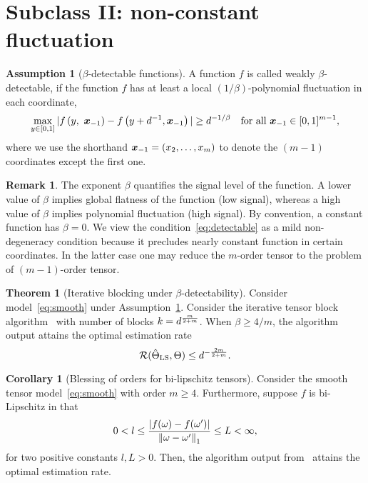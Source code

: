 \documentclass[10pt]{article}
\theoremstyle{definition}
\newtheorem{thm}{Theorem}[section]
\newtheorem{cor}{Corollary}[section]
\theoremstyle{definition}
\newtheorem{assumption}{Assumption}
\newtheorem{rmk}{Remark}
\theoremstyle{definition}
\begin{document}
\section{Subclass II: non-constant fluctuation}
\begin{assumption}[$\beta$-detectable functions]\label{ass:detectable} A function $f$ is called weakly $\beta$-detectable, if the function $f$ has at least a local $(1/\beta)$-polynomial fluctuation in each coordinate,
\begin{equation}\label{eq:detectable}
\max_{y\in[0,1]} |f\left(y,\ \bm x_{-1}\right) - f\left(y+d^{-1}, \bm x_{-1}\right)|\geq d^{-1/\beta} \quad \text{for all }\bm x_{-1}\in[0,1]^{m-1},
\end{equation}
where we use the shorthand $\bm x_{-1}= (x_2,\ldots,x_m)$ to denote the $(m-1)$ coordinates except the first one.  
\end{assumption}

\begin{rmk} 
The exponent $\beta$ quantifies the signal level of the function. A lower value of $\beta$ implies global flatness of the function (low signal), whereas a high value of $\beta$ implies polynomial fluctuation (high signal). By convention, a constant function has $\beta=0$. We view the condition~\eqref{eq:detectable} as a mild non-degeneracy condition because it precludes nearly constant function in certain coordinates. In the latter case one may reduce the $m$-order tensor to the problem of $(m-1)$-order tensor.  
\end{rmk}

\begin{thm}[Iterative blocking under $\beta$-detectability]Consider model~\ref{eq:smooth} under Assumption~\ref{ass:detectable}. Consider the iterative tensor block algorithm~\cite{han2020exact} with number of blocks $k=d^{m\over 2+m}$. When $\beta \geq 4/m$, the algorithm output attains the optimal estimation rate 
\[
\mathcal{R}(\hat \Theta_{\text{LS}}, \Theta)\leq d^{-{2m\over 2+m}}.
\]
\end{thm}


\begin{cor}[Blessing of orders for bi-lipschitz tensors] Consider the smooth tensor model~\eqref{eq:smooth} with order $m\geq 4$. Furthermore, suppose $f$ is bi-Lipschitz in that
\[
0< l \leq {|f(\omega)-f(\omega')| \over \left\lVert\omega-\omega'\right\rVert_1} \leq L < \infty,
\]
for two positive constants $l,L>0$. Then, the algorithm output from~\cite{han2020exact} attains the optimal estimation rate. 
\end{cor}
\end{document}
